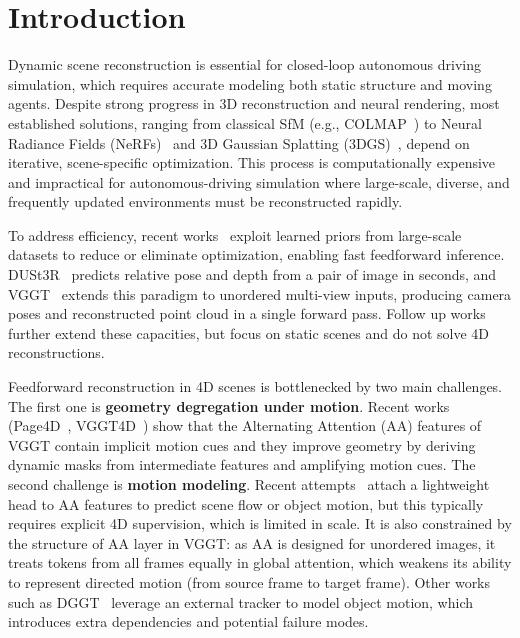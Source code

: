 \section{Introduction}
\label{sec:intro}


Dynamic scene reconstruction is essential for closed-loop autonomous driving simulation, which requires accurate modeling  both static structure and moving agents.
Despite strong progress in 3D reconstruction and neural rendering, most established solutions, ranging from classical SfM (e.g., COLMAP~\cite{schoenberger2016mvs}) to Neural Radiance Fields (NeRFs)~\cite{mildenhall2021nerf, wang2021neus,chen2026periodic} and 3D Gaussian Splatting (3DGS)~\cite{kerbl3Dgaussians, yan2024street, chen2024omnire}, depend on iterative, scene-specific optimization. This process is computationally expensive and impractical for autonomous-driving simulation where large-scale, diverse, and frequently updated environments must be reconstructed rapidly.

To address efficiency, recent works~\cite{charatan2024pixelsplat,mvsplat,depthsplat,hong2023lrm,yang2024storm,chen2025dggt,worldsplat} exploit learned priors from large-scale datasets to reduce or eliminate optimization, enabling fast feedforward inference. DUSt3R~\cite{wang2024dust3r} predicts relative pose and depth from a pair of image in seconds, and VGGT~\cite{vggt} extends this paradigm to unordered multi-view inputs, producing camera poses and reconstructed point cloud in a single forward pass. Follow up works~\cite{murai2025mast3r,cut3r,vggtlong,pi3,streamVGGT} further extend these capacities, but focus on static scenes and do not solve 4D reconstructions. 

Feedforward reconstruction in 4D scenes is bottlenecked by two main challenges. The first one is \textbf{geometry degregation under motion}. 
Recent works (Page4D~\cite{page4d}, VGGT4D~\cite{hu2025vggt4d}) show that the Alternating Attention (AA) features of VGGT contain implicit motion cues and they improve geometry by deriving dynamic masks from intermediate features and amplifying motion cues. 
The second challenge is \textbf{motion modeling}. Recent attempts~\cite{lin2025movies, karhade2025any4d} attach a lightweight head to AA features to predict scene flow or object motion, but this typically requires explicit 4D supervision, which is limited in scale. It is also constrained by the structure of AA layer in VGGT: as AA is designed for unordered images, it treats tokens from all frames equally in global attention, which weakens its ability to represent directed motion (from source frame to target frame). Other works such as DGGT~\cite{chen2025dggt} leverage an external tracker to model object motion, which introduces extra dependencies and potential failure modes.

